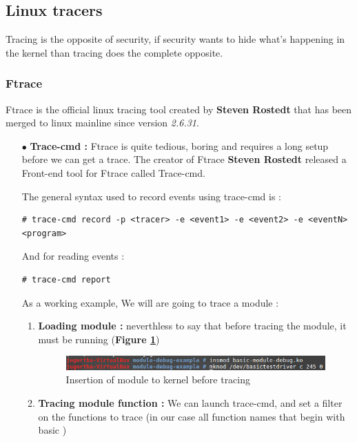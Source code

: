 \subsection{Linux tracers}
Tracing is the opposite of security, if security wants to hide what's happening in the kernel than tracing does the complete opposite.

\subsubsection{Ftrace}
Ftrace is the official linux tracing tool created by \og \textbf{Steven Rostedt} \fg that has been merged to linux mainline since version \emph{2.6.31}.

\begin{itemize}
	\item[$\bullet$] \textbf{Trace-cmd : }
Ftrace is quite tedious, boring and requires a long setup before we can get a trace. The creator of Ftrace \og \textbf{Steven Rostedt} \fg released a Front-end tool for Ftrace called Trace-cmd.	

The general syntax used to record events using trace-cmd is :
	\begin{lstlisting}[style=BashInputStyle]
# trace-cmd record -p <tracer> -e <event1> -e <event2> -e <eventN> <program>
	\end{lstlisting}
	
And for reading events :
	\begin{lstlisting}[style=BashInputStyle]
# trace-cmd report
	\end{lstlisting}	

As a working example, We will are going to trace a module :
\begin{enumerate}
	\item \textbf{Loading module : } neverthless to say that before tracing the module, it must be running (\textbf{Figure \ref{Insertion of module to kernel before tracing}})
		\begin{figure}[H]
			\centering
        	\includegraphics[scale=0.32]{img/solution/insert-your-module-to-kernel.png}
        	\caption{Insertion of module to kernel before tracing}
        	\label{Insertion of module to kernel before tracing}
    	\end{figure}
    		
	\item \textbf{Tracing module function : } We can launch trace-cmd, and set a filter on the functions to trace (in our case all function names that begin with \og basic \fg)
	

\end{enumerate}
\end{itemize}
